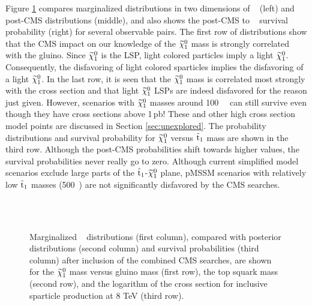 Figure \ref{fig:twoD} compares marginalized distributions in two dimensions of \preCMS~ (left) and post-CMS distributions (middle), and also shows the post-CMS to \preCMS~ survival probability (right) for several observable pairs.  The first row of distributions show that the CMS impact on our knowledge of 
the $\widetilde{\chi}^0_1$ mass is strongly correlated with the gluino.  Since $\widetilde{\chi}^0_1$ is the LSP,  light colored particles imply a light $\widetilde{\chi}^0_1$.
Consequently, the disfavoring of light colored sparticles implies the disfavoring of a light $\widetilde{\chi}^0_1$.  In the last row, it is seen that the $\widetilde{\chi}^0_1$ mass is correlated most strongly with the cross section and that light $\widetilde{\chi}^0_1$ LSPs are indeed disfavored for the reason just given.  
However, scenarios with $\widetilde{\chi}^0_1$ masses around 100~\GeV~
can still survive even though they have cross sections above 1\,pb! These and other high cross section model points are discussed in Section \ref{sec:unexplored}.
The probability distributions and survival
probability for $\widetilde{\chi}^0_1$ versus $\tilde{\text{t}}_1$ mass are shown in the third row.  Although the
post-CMS probabilities shift towards higher values, the survival
probabilities never really go to zero.  Although current simplified model
scenarios exclude large parts of the $\tilde{\text{t}}_1$-$\widetilde{\chi}^0_1$ plane, 
pMSSM scenarios with relatively low $\tilde{\text{t}}_1$ masses (500~\GeV) are
not significantly disfavored by the CMS searches. 

\begin{figure}[p]
  \centering
  \\
    \\
\vspace{1mm}
  \caption{Marginalized \preCMS~ distributions (first column),
    compared with posterior distributions (second column)
    and survival probabilities (third column) after inclusion of the combined CMS searches,
    are shown for the
    $\widetilde{\chi}^0_1$ mass versus gluino mass (first row), the top squark mass (second row),  and the
    logarithm of the cross section for inclusive sparticle production at 8 TeV (third row).
  }
  \label{fig:twoD}
\end{figure}

